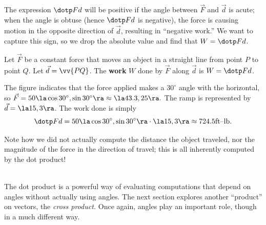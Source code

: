 The expression $\dotp Fd$ will be positive if the angle between $\vec F$ and $\vec d$ is acute; when the angle is obtuse (hence $\dotp Fd$ is negative), the force is causing motion in the opposite direction of $\vec d$, resulting in ``negative work.'' We want to capture this sign, so we drop the absolute value and find that $W = \dotp Fd$.

{Let $\vec F$ be a constant force that moves an object in a straight line from point $P$ to point $Q$. Let $\vec d = \vv{PQ}$. The \textbf{work} $W$ done by $\vec F$ along $\vec d$ is $W = \dotp Fd$.
}

{The figure indicates that the force applied makes a $30^\circ$ angle with the horizontal, so $\vec F = 50\la \cos 30^\circ,\sin 30^\circ\ra \approx \la 43.3,25\ra.$ The ramp is represented by $\vec d  = \la 15,3\ra$. The work done is simply
$$\dotp Fd = 50\la \cos 30^\circ,\sin 30^\circ\ra \cdot \la 15,3\ra \approx 724.5 \text{ft--lb}.$$

Note how we did not actually compute the distance the object traveled, nor the magnitude of the force in the direction of travel; this is all inherently computed by the dot product!
}\\

The dot product is a powerful way of evaluating computations that depend on angles without actually using angles. The next section explores another ``product'' on vectors, the \emph{cross product.} Once again, angles play an important role, though in a much different way.

